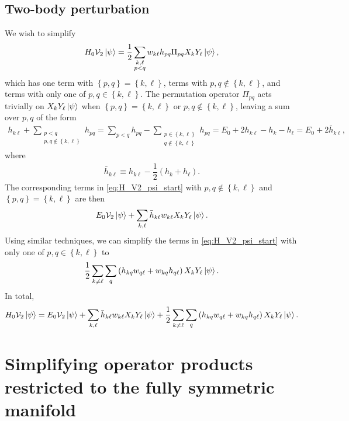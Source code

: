 \documentclass[nofootinbib,notitlepage,11pt]{revtex4-2}
\newcommand{\f}[2]{\dfrac{#1}{#2}} %
\newcommand{\p}[1]{\left(#1\right)} %
\renewcommand{\set}[1]{\left\{#1\right\}} %
\newcommand{\1}{\mathds{1}}
\newcommand{\V}{\mathcal{V}}
\begin{document}
\subsection{Two-body perturbation}
\label{sec:H_V2_psi}

We wish to simplify
\begin{align}
  H_0 \V_2 \ket\psi
  = \f12 \sum_{\substack{k,\ell\\p<q}} w_{k\ell} h_{pq}
  \Pi_{pq} X_k Y_\ell \ket\psi,
  \label{eq:H_V2_psi_start}
\end{align}
which has one term with $\set{p,q}=\set{k,\ell}$, terms with
$p,q\notin\set{k,\ell}$, and terms with only one of
$p,q\in\set{k,\ell}$.  The permutation operator $\Pi_{pq}$ acts
trivially on $X_k Y_\ell \ket\psi$ when $\set{p,q}=\set{k,\ell}$ or
$p,q\notin\set{k,\ell}$, leaving a sum over $p,q$ of the form
\begin{align}
  h_{k\ell} + \sum_{\substack{p<q\\p,q\notin\set{k,\ell}}} h_{pq}
  = \sum_{p<q} h_{pq}
  - \sum_{\substack{p\in\set{k,\ell}\\q\notin\set{k,\ell}}} h_{pq}
  = E_0 + 2 h_{k\ell} - h_k - h_\ell
  = E_0 + 2 \bar h_{k\ell},
\end{align}
where
\begin{align}
  \bar h_{k\ell} \equiv h_{k\ell} - \f12\p{h_k + h_\ell}.
\end{align}
The corresponding terms in \eqref{eq:H_V2_psi_start} with
$p,q\notin\set{k,\ell}$ and $\set{p,q}=\set{k,\ell}$ are then
\begin{align}
  E_0 \V_2 \ket\psi
  + \sum_{k,\ell} \bar h_{k\ell} w_{k\ell} X_k Y_\ell \ket\psi.
\end{align}
Using similar techniques, we can simplify the terms in
\eqref{eq:H_V2_psi_start} with only one of $p,q\in\set{k,\ell}$ to
\begin{align}
  \f12 \sum_{k\ne\ell} \sum_q \p{h_{kq} w_{q\ell} + w_{kq} h_{q\ell}}
  X_k Y_\ell \ket\psi.
\end{align}
In total,
\begin{align}
  H_0 \V_2 \ket\psi
  = E_0 \V_2 \ket\psi
  + \sum_{k,\ell} \bar h_{k\ell} w_{k\ell} X_k Y_\ell \ket\psi
  + \f12 \sum_{k\ne\ell} \sum_q \p{h_{kq} w_{q\ell} + w_{kq} h_{q\ell}}
  X_k Y_\ell \ket\psi.
\end{align}

\section{Simplifying operator products restricted to the fully
  symmetric manifold}
\label{sec:sym_prod}
\end{document}

